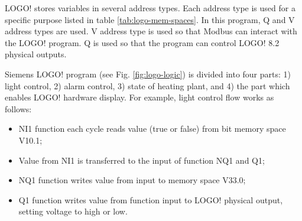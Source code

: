 LOGO! stores variables in several address types. Each address type is used for a specific purpose listed in table \ref{tab:logo-mem-spaces}. In this program, Q and V address types are used. V address type is used so that Modbus can interact with the LOGO! program. Q is used so that the program can control LOGO! 8.2 physical outputs.


Siemens LOGO! program (see Fig. \ref{fig:logo-logic}) is divided into four parts: 1) light control, 2) alarm control, 3) state of heating plant, and 4) the part which enables LOGO! hardware display. For example, light control flow works as follows: 

\begin{itemize}
	\item NI1 function each cycle reads value (true or false) from bit memory space V10.1;
	\item Value from NI1 is transferred to the input of function NQ1 and Q1;
	\item NQ1 function writes value from input to memory space V33.0;
	\item Q1 function writes value from function input to LOGO! physical output, setting voltage to high or low.
\end{itemize}

